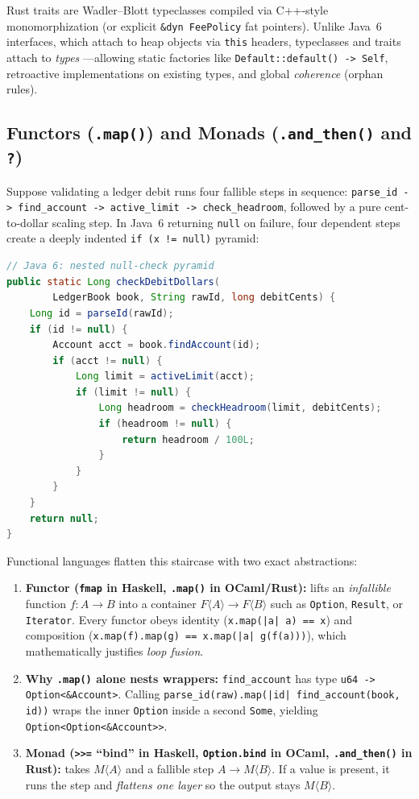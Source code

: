 Rust traits are Wadler--Blott typeclasses compiled via C++-style monomorphization (or
explicit \texttt{\&dyn FeePolicy} fat pointers). Unlike Java~6 interfaces, which attach
to heap objects via \texttt{this} headers, typeclasses and traits attach to \emph{types}
---allowing static factories like \texttt{Default::default() -> Self}, retroactive
implementations on existing types, and global \emph{coherence} (orphan rules).

\subsection{Functors (\texttt{.map()}) and Monads (\texttt{.and\_then()} and \texttt{?})}

Suppose validating a ledger debit runs four fallible steps in sequence:
\texttt{parse\_id -> find\_account -> active\_limit -> check\_headroom}, followed by a
pure cent-to-dollar scaling step. In Java~6 returning \texttt{null} on failure, four
dependent steps create a deeply indented \texttt{if (x != null)} pyramid:

\begin{lstlisting}[language=Java]
// Java 6: nested null-check pyramid
public static Long checkDebitDollars(
        LedgerBook book, String rawId, long debitCents) {
    Long id = parseId(rawId);
    if (id != null) {
        Account acct = book.findAccount(id);
        if (acct != null) {
            Long limit = activeLimit(acct);
            if (limit != null) {
                Long headroom = checkHeadroom(limit, debitCents);
                if (headroom != null) {
                    return headroom / 100L;
                }
            }
        }
    }
    return null;
}
\end{lstlisting}

Functional languages flatten this staircase with two exact abstractions:

\begin{enumerate}
  \item \textbf{Functor (\texttt{fmap} in Haskell, \texttt{.map()} in OCaml/Rust):}
    lifts an \emph{infallible} function $f : A \to B$ into a container $F\langle A\rangle \to F\langle B\rangle$ such as \texttt{Option}, \texttt{Result}, or \texttt{Iterator}. Every functor obeys identity (\texttt{x.map(|a| a) == x}) and composition (\texttt{x.map(f).map(g) == x.map(|a| g(f(a)))}), which mathematically justifies \emph{loop fusion}.
  \item \textbf{Why \texttt{.map()} alone nests wrappers:} \texttt{find\_account} has
    type \texttt{u64 -> Option<\&Account>}. Calling \texttt{parse\_id(raw).map(|id| find\_account(book, id))}
    wraps the inner \texttt{Option} inside a second \texttt{Some}, yielding
    \texttt{Option<Option<\&Account>>}.
  \item \textbf{Monad (\texttt{>>=} ``bind'' in Haskell, \texttt{Option.bind} in OCaml,
    \texttt{.and\_then()} in Rust):} takes $M\langle A\rangle$ and a fallible step $A \to M\langle B\rangle$. If a value is present, it runs the step and \emph{flattens one layer} so the output stays $M\langle B\rangle$.
\end{enumerate}

